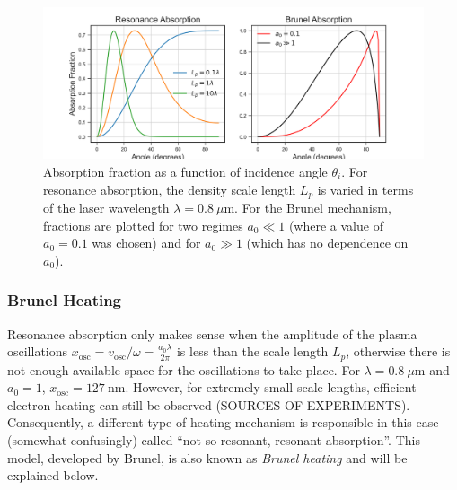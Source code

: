 \begin{figure}
	\centering 
	\includegraphics[width=\linewidth]{planning/images/absorption.png}
	\caption{Absorption fraction as a function of incidence angle $\theta_i$. For resonance absorption, the density scale length $L_p$ is varied in terms of the laser wavelength $\lambda = \SI{0.8}{\mu \meter}$. For the Brunel mechanism, fractions are plotted for two regimes $a_0 \ll 1$ (where a value of $a_0 = 0.1$ was chosen) and for $a_0 \gg 1$ (which has no dependence on $a_0$).}
	\label{fig:absorption}
\end{figure}

\subsubsection{Brunel Heating}
Resonance absorption only makes sense when the amplitude of the plasma oscillations $x_\text{osc} = v_\text{osc} / \omega = \frac{a_0 \lambda}{2 \pi}$ is less than the scale length $L_p$\cite{Gibbon_2005_Plasma}, otherwise there is not enough available space for the oscillations to take place. For $\lambda = \SI{0.8}{\mu \meter}$ and $a_0 = 1$, $x_\text{osc} = \SI{127}{\nano \meter}$. However, for extremely small scale-lengths, efficient electron heating can still be observed (SOURCES OF EXPERIMENTS). Consequently, a different type of heating mechanism is responsible in this case (somewhat confusingly) called ``not so resonant, resonant absorption''\cite{Brunel_1987_PRL}. This model, developed by Brunel, is also known as \emph{Brunel heating} and will be explained below. 

